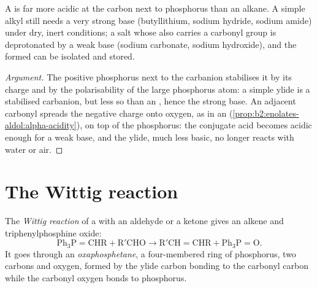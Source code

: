 \begin{proposition}\label{prop:b2:wittig:ylide-acidity}
A  is far more acidic at the carbon next to phosphorus than an alkane. A simple alkyl
 still needs a very strong base (butyllithium, sodium hydride, sodium amide) under dry,
inert conditions; a salt whose  also carries a carbonyl group is deprotonated by a weak base
(sodium carbonate, sodium hydroxide), and the  formed can be isolated and stored.
\end{proposition}

\begin{proof}[Argument]
The positive phosphorus next to the carbanion stabilises it by its charge and by the polarisability of
the large phosphorus atom: a simple ylide is a stabilised carbanion, but less so than an ,
hence the strong base. An adjacent carbonyl spreads the negative charge onto oxygen, as in an 
(\cref{prop:b2:enolates-aldol:alpha-acidity}), on top of the phosphorus: the conjugate acid becomes
acidic enough for a weak base, and the ylide, much less basic, no longer reacts with water or air.
\end{proof}

\section{The Wittig reaction}

\begin{definition}\label{def:b2:wittig:wittig}
The \emph{Wittig reaction} of a  with an aldehyde or a ketone
gives an alkene and triphenylphosphine oxide:
\begin{equation*}
\mathrm{Ph_3P{=}CHR + R'CHO \longrightarrow R'CH{=}CHR + Ph_3P{=}O}.
\end{equation*}
It goes through an \emph{oxaphosphetane}, a four-membered ring of phosphorus, two
carbons and oxygen, formed by the ylide carbon bonding to the carbonyl carbon while the carbonyl oxygen
bonds to phosphorus.
\end{definition}

